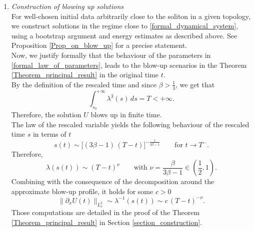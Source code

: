 \documentclass[16pt,english, oneside,reqno]{smfart}
\begin{document}
\begin{enumerate}
    \item \textit{Construction of blowing up solutions}\\
    For well-chosen initial data arbitrarily close to the soliton in a given topology, we construct solutions 
    in the regime close to \eqref{formal_dynamical_system}, 
    using a bootstrap argument and energy estimates as described above.
    See Proposition \ref{Prop_on_blow_up} for a precise statement.\\
    Now, we justify formally that the behaviour of the parameters in \eqref{formal_law_of_parameters},  leads to the blow-up scenarios in the Theorem \ref{Theorem_principal_result} in the original time $t$.\\
    By the definition of the rescaled time and since $\beta > \frac 13$, we get that 
    \begin{equation}
        \int^{+\infty}_{s_0} \lambda^3(s)\,ds = T < +\infty.
    \end{equation}
    Therefore, the solution $U$ blows up in finite time.\\
    The law of the rescaled variable yields the following  behaviour of 
    the rescaled time $s$ in terms of $t$
    \begin{equation}
        s(t) \sim \big[(3\beta-1) \,(T-t)\big]^{-\frac{1}{3\beta-1}}  \qquad \text{for}\,\, t \to T^{-}.
    \end{equation}
    Therefore, 
    \begin{equation}
        \lambda(s(t)) \sim (T-t)^{\nu} \qquad \text{with }\nu = \frac{\beta}{3\beta-1}\in (\frac 12, 1).
    \end{equation}
    Combining with the consequence of the decomposition around the approximate blow-up profile, it holds for some $c>0$
    \begin{equation}
        \|\partial_x U(t)\|_{L^2_x} \sim \lambda^{-1}(s(t)) \sim c\,(T-t)^{-\nu} .
    \end{equation}
    Those computations are detailed in the proof of the Theorem \ref{Theorem_principal_result} in  Section \ref{section_construction}.
\end{enumerate}
\end{document}
